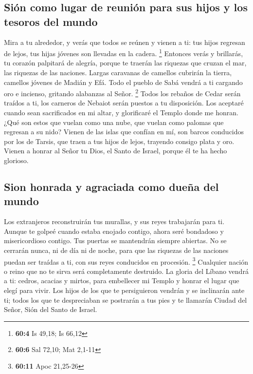 \hypertarget{siuxf3n-como-lugar-de-reuniuxf3n-para-sus-hijos-y-los-tesoros-del-mundo}{%
\subsection{Sión como lugar de reunión para sus hijos y los tesoros del
mundo}\label{siuxf3n-como-lugar-de-reuniuxf3n-para-sus-hijos-y-los-tesoros-del-mundo}}

 Mira a tu alrededor, y verás que todos se reúnen y vienen
a ti: tus hijos regresan de lejos, tus hijas jóvenes son llevadas en la
cadera. \footnote{\textbf{60:4} Is 49,18; Is 66,12} 
Entonces verás y brillarás, tu corazón palpitará de alegría, porque te
traerán las riquezas que cruzan el mar, las riquezas de las naciones.
 Largas caravanas de camellos cubrirán la tierra, camellos
jóvenes de Madián y Efá. Todo el pueblo de Sabá vendrá a ti cargando oro
e incienso, gritando alabanzas al Señor. \footnote{\textbf{60:6} Sal
  72,10; Mat 2,1-11}  Todos los rebaños de Cedar serán
traídos a ti, los carneros de Nebaiot serán puestos a tu disposición.
Los aceptaré cuando sean sacrificados en mi altar, y glorificaré el
Templo donde me honran.  ¿Qué son estos que vuelan como
una nube, que vuelan como palomas que regresan a su nido? 
Vienen de las islas que confían en mí, son barcos conducidos por los de
Tarsis, que traen a tus hijos de lejos, trayendo consigo plata y oro.
Vienen a honrar al Señor tu Dios, el Santo de Israel, porque él te ha
hecho glorioso.

\hypertarget{sion-honrada-y-agraciada-como-dueuxf1a-del-mundo}{%
\subsection{Sion honrada y agraciada como dueña del
mundo}\label{sion-honrada-y-agraciada-como-dueuxf1a-del-mundo}}

 Los extranjeros reconstruirán tus murallas, y sus reyes
trabajarán para ti. Aunque te golpeé cuando estaba enojado contigo,
ahora seré bondadoso y misericordioso contigo.  Tus
puertas se mantendrán siempre abiertas. No se cerrarán nunca, ni de día
ni de noche, para que las riquezas de las naciones puedan ser traídas a
ti, con sus reyes conducidos en procesión. \footnote{\textbf{60:11} Apoc
  21,25-26}  Cualquier nación o reino que no te sirva
será completamente destruido.  La gloria del Líbano
vendrá a ti: cedros, acacias y mirtos, para embellecer mi Templo y
honrar el lugar que elegí para vivir.  Los hijos de los
que te persiguieron vendrán y se inclinarán ante ti; todos los que te
despreciaban se postrarán a tus pies y te llamarán Ciudad del Señor,
Sión del Santo de Israel.

